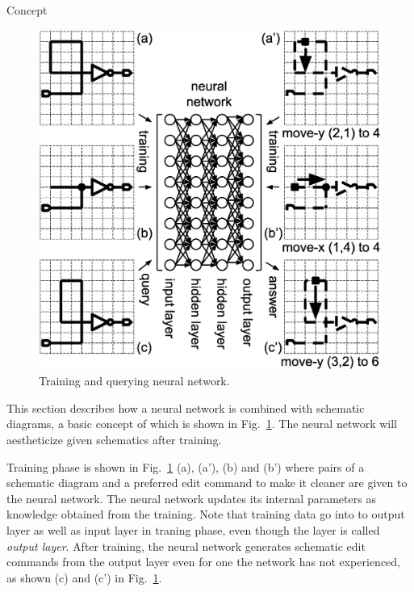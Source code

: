 \documentclass[twocolumn]{article}
\makeatletter
\def\section{\@startsection {section}{1}{\z@}{20pt plus 2pt minus 2pt}
{8pt plus 2pt minus 2pt}{\centering\normalsize\sc
\edef\@svsec{\thesection.\ }}}
\def\thesection{\Roman{section}}
\makeatother
\begin{document}
\section{Concept}

\begin{figure}[!tp]
 \begin{center}
  \begin{minipage}{\hsize}
   \includegraphics[width=\hsize]{fig/nn_schem_05.eps}
   \caption{Training and querying neural network.}
   \label{fig:nn_schem}
  \end{minipage}
 \end{center}
\end{figure}

This section describes how a neural network is
combined with schematic diagrams,
a basic concept of which is shown in Fig.\ \ref{fig:nn_schem}.
The neural network will aestheticize given schematics after training.

Training phase is shown in Fig.\ \ref{fig:nn_schem} (a), (a'), (b) and (b')
where pairs of a schematic diagram and a preferred edit command
to make it cleaner are given to the neural network.
The neural network updates its internal parameters as knowledge obtained
from the training.
Note that training data go into to output layer
as well as input layer in traning phase,
even though the layer is called {\it output layer}.
After training, the neural network generates schematic edit commands
from the output layer even for one the network has not experienced,
as shown (c) and (c') in Fig.\ \ref{fig:nn_schem}.
\end{document}

